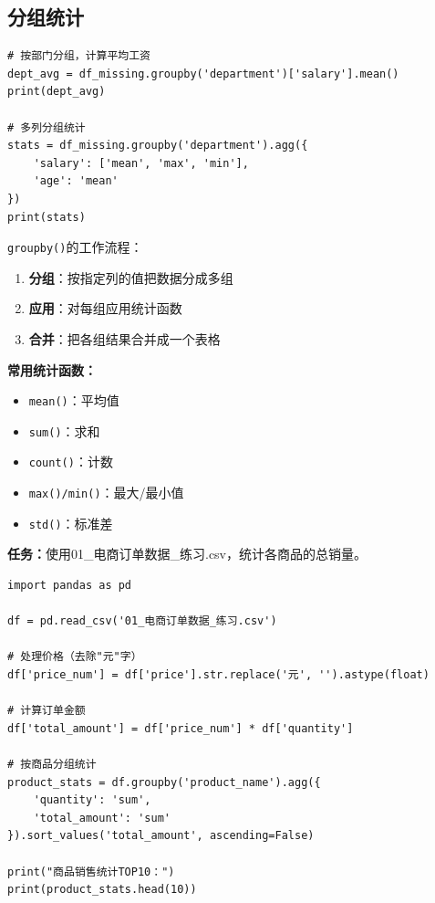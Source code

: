 \documentclass[12pt,a4paper]{article}
\begin{document}
\subsection{分组统计}

\begin{lstlisting}[caption={按部门统计工资}]
# 按部门分组，计算平均工资
dept_avg = df_missing.groupby('department')['salary'].mean()
print(dept_avg)

# 多列分组统计
stats = df_missing.groupby('department').agg({
    'salary': ['mean', 'max', 'min'],
    'age': 'mean'
})
print(stats)
\end{lstlisting}

\begin{knowledgebox}
\texttt{groupby()}的工作流程：

\begin{enumerate}
    \item \textbf{分组}：按指定列的值把数据分成多组
    \item \textbf{应用}：对每组应用统计函数
    \item \textbf{合并}：把各组结果合并成一个表格
\end{enumerate}

\textbf{常用统计函数：}
\begin{itemize}
    \item \texttt{mean()}：平均值
    \item \texttt{sum()}：求和
    \item \texttt{count()}：计数
    \item \texttt{max()/min()}：最大/最小值
    \item \texttt{std()}：标准差
\end{itemize}
\end{knowledgebox}

\begin{practicebox}
\textbf{任务：}使用01\_电商订单数据\_练习.csv，统计各商品的总销量。

\begin{lstlisting}
import pandas as pd

df = pd.read_csv('01_电商订单数据_练习.csv')

# 处理价格（去除"元"字）
df['price_num'] = df['price'].str.replace('元', '').astype(float)

# 计算订单金额
df['total_amount'] = df['price_num'] * df['quantity']

# 按商品分组统计
product_stats = df.groupby('product_name').agg({
    'quantity': 'sum',
    'total_amount': 'sum'
}).sort_values('total_amount', ascending=False)

print("商品销售统计TOP10：")
print(product_stats.head(10))
\end{lstlisting}
\end{practicebox}
\end{document}
